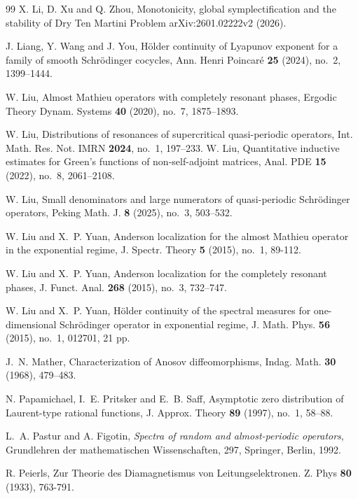 \documentclass[reqno,11pt]{amsart}
\begin{document}
\begin{thebibliography}{99}
X. Li, D. Xu and Q. Zhou, Monotonicity, global symplectification and the stability of Dry Ten Martini Problem   arXiv:2601.02222v2 (2026). 

J. Liang, Y. Wang and J. You, H\"older continuity of Lyapunov exponent for a family of smooth Schr\"odinger cocycles, Ann. Henri Poincar\'e{} {\bf 25} (2024), no.~2, 1399--1444.

W. Liu, Almost Mathieu operators with completely resonant phases, Ergodic Theory Dynam. Systems {\bf 40} (2020), no.~7, 1875--1893.

W. Liu, Distributions of resonances of supercritical quasi-periodic operators, Int. Math. Res. Not. IMRN {\bf 2024}, no.~1, 197--233.
W. Liu, Quantitative inductive estimates for Green's functions of non-self-adjoint matrices, Anal. PDE {\bf 15} (2022), no.~8, 2061--2108.

W. Liu, Small denominators and large numerators of quasi-periodic Schr\"odinger operators, Peking Math. J. {\bf 8} (2025), no.~3, 503--532.


 W. Liu and X.~P. Yuan, Anderson localization for the almost Mathieu operator in the exponential regime, J. Spectr. Theory {\bf 5} (2015), no.~1, 89-112. 

W. Liu and X.~P. Yuan, Anderson localization for the completely resonant phases, J. Funct. Anal. {\bf 268} (2015), no.~3, 732--747.



W. Liu and X.~P. Yuan, H\"older continuity of the spectral measures for one-dimensional Schr\"odinger operator in exponential regime, J. Math. Phys. {\bf 56} (2015), no.~1, 012701, 21 pp.


J.~N. Mather, Characterization of Anosov diffeomorphisms, Indag. Math. {\bf 30} (1968), 479--483.

N. Papamichael, I.~E. Pritsker and E.~B. Saff, Asymptotic zero distribution of Laurent-type rational functions, J. Approx. Theory {\bf 89} (1997), no.~1, 58--88.


L.~A. Pastur and A. Figotin, {\it Spectra of random and almost-periodic operators}, Grundlehren der mathematischen Wissenschaften, 297, Springer, Berlin, 1992.
 
  R. Peierls, Zur Theorie des Diamagnetismus von Leitungselektronen.  Z. Phys {\bf80} (1933), 763-791.





\end{thebibliography}
\end{document}
